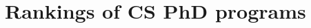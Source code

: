 \documentclass[oneside,11pt,dvipsnames]{book}
\newenvironment{commentbox}[1][]{
  \small
  \begin{mybox}
    {\small \textbf{#1}}
  }{
  \end{mybox}
}
\begin{document}
  





\chapter{Rankings of CS PhD programs}\label{sec:ranking}
\end{document}
